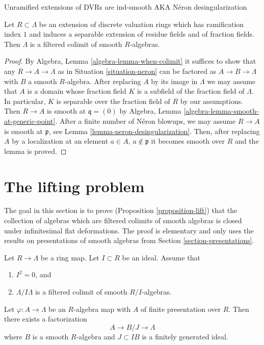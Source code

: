 \begin{lemma}
\label{lemma-neron-colimit}
\begin{slogan}
Unramified extensions of DVRs are ind-smooth AKA N\'eron desingularization
\end{slogan}
Let $R \subset \Lambda$ be an extension of discrete valuation
rings which has ramification index $1$ and induces a separable
extension of residue fields and of fraction fields.
Then $\Lambda$ is a filtered colimit of smooth $R$-algebras.
\end{lemma}

\begin{proof}
By Algebra, Lemma \ref{algebra-lemma-when-colimit} it suffices to show
that any $R \to A \to \Lambda$ as in Situation \ref{situation-neron}
can be factored as $A \to B \to \Lambda$ with $B$ a
smooth $R$-algebra. After replacing $A$ by its image in $\Lambda$
we may assume that $A$ is a domain whose fraction field $K$
is a subfield of the fraction field of $\Lambda$.
In particular, $K$ is separable over the fraction field of $R$
by our assumptions. Then $R \to A$ is smooth at $\mathfrak q = (0)$ by
Algebra, Lemma \ref{algebra-lemma-smooth-at-generic-point}.
After a finite number of N\'eron blowups, we may assume $R \to A$
is smooth at $\mathfrak p$, see Lemma \ref{lemma-neron-desingularization}.
Then, after replacing $A$ by a localization
at an element $a \in A$, $a \not \in \mathfrak p$ it becomes
smooth over $R$ and the lemma is proved.
\end{proof}












\section{The lifting problem}
\label{section-lifting}

\noindent
The goal in this section is to prove (Proposition \ref{proposition-lift})
that the collection of algebras which are filtered colimits of smooth algebras
is closed under infinitesimal flat deformations. The proof is elementary
and only uses the results on presentations of smooth algebras from
Section \ref{section-presentations}.

\begin{lemma}
\label{lemma-lift-once}
Let $R \to \Lambda$ be a ring map. Let $I \subset R$ be an ideal.
Assume that
\begin{enumerate}
\item $I^2 = 0$, and
\item $\Lambda/I\Lambda$ is a filtered colimit of smooth $R/I$-algebras.
\end{enumerate}
Let $\varphi : A \to \Lambda$ be an $R$-algebra map with $A$ of finite
presentation over $R$. Then there exists a factorization
$$
A \to B/J \to \Lambda
$$
where $B$ is a smooth $R$-algebra and $J \subset IB$ is a finitely generated
ideal.
\end{lemma}

